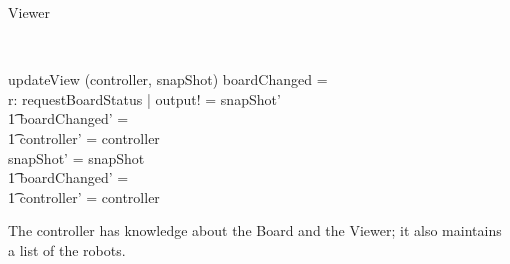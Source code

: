 \begin{class}{Viewer}
\begin{classcom}
\end{classcom} \\
\begin{schema}{updateView}
\Delta (controller, snapShot)
\where
\IF boardChanged = \true \\
\THEN \exists r: requestBoardStatus | output! = snapShot' \\ \t1
boardChanged' = \false \\ \t1
controller' = controller \\
\ELSE snapShot' = snapShot \\ \t1
boardChanged' = \false \\ \t1
controller' = controller
\end{schema}
\end{class}

The controller has knowledge about the Board and the Viewer; it also maintains a list of the robots.
